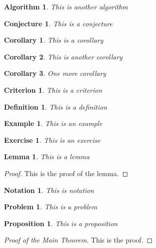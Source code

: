 \documentclass[12pt,reqno, twoside]{amsbook}
\theoremstyle{plain}
\newtheorem{algorithm}{Algorithm}[chapter]
\newtheorem{conjecture}{Conjecture}[chapter]
\newtheorem{corollary}{Corollary}[chapter]
\newtheorem{criterion}{Criterion}[chapter]
\newtheorem{definition}{Definition}[chapter]
\newtheorem{example}{Example}[chapter]
\newtheorem{exercise}{Exercise}[chapter]
\newtheorem{lemma}{Lemma}[chapter]
\newtheorem{notation}{Notation}[chapter]
\newtheorem{problem}{Problem}[chapter]
\newtheorem{proposition}{Proposition}[chapter]
\numberwithin{equation}{chapter}
\numberwithin{section}{chapter}
\begin{document}
\begin{algorithm}
This is another algorithm
\end{algorithm}

\begin{conjecture}
This is a conjecture
\end{conjecture}

\begin{corollary}
This is a corollary
\end{corollary}

\begin{corollary}
This is another corollary
\end{corollary}

\begin{corollary}
One more corollary
\end{corollary}

\begin{criterion}
This is a criterion
\end{criterion}

\begin{definition}
This is a definition
\end{definition}

\begin{example}
This is an example
\end{example}

\begin{exercise}
This is an exercise
\end{exercise}

\begin{lemma}
This is a lemma
\end{lemma}

\begin{proof}
This is the proof of the lemma.
\end{proof}

\begin{notation}
This is notation
\end{notation}

\begin{problem}
This is a problem
\end{problem}

\begin{proposition}
This is a proposition
\end{proposition}


\begin{proof}
[Proof of the Main Theorem]This is the proof.
\end{proof}
\end{document}
